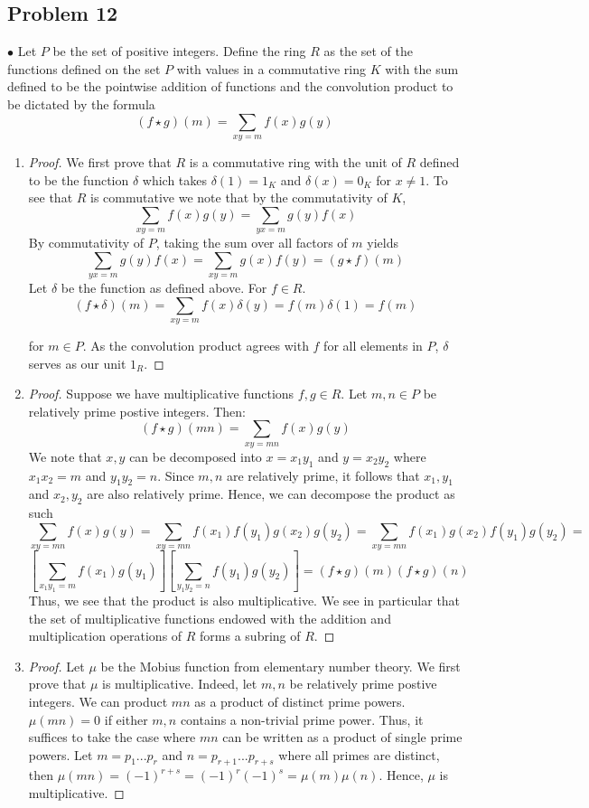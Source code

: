 \documentclass[Lang.tex]{subfiles}
\begin{document}
\subsection{Problem 12}			
 $\bullet$  Let $P$ be the set of positive integers. Define the ring $R$ as the set of the functions defined on the set $P$ with values in a commutative ring $K$ with the sum defined to be the pointwise addition of functions and the convolution product to be dictated by the formula
 $$ (f \star g)(m)  = \sum_{xy = m} f(x)g(y) $$ 
\begin{enumerate}
	\item 
	\begin{proof}
		We first prove that $R$ is a commutative ring with the unit of $R$ defined to be the function $\delta$ which takes $\delta(1) = 1_K$ and $\delta(x) = 0_K$ for $x \neq 1$. To see that $R$ is commutative we note that by the commutativity of $K$, $$ \sum_{xy = m}f(x)g(y) = \sum_{yx = m} g(y)f(x) $$ By commutativity of $P$, taking the sum over all factors of $m$ yields  $$\sum_{yx = m} g(y)f(x) = \sum_{xy = m} g(x)f(y) = (g\star f)(m)$$ Let $\delta$ be the function as defined above. For $f \in R$.
		$$ (f \star \delta)(m) = \sum_{xy = m} f(x)\delta(y) =  f(m)\delta(1)  = f(m) $$ 
		
		for $m \in P$. As the convolution product agrees with $f$ for all elements in $P$, $\delta$ serves as our unit $1_R$.
	\end{proof}
	\item 
		\begin{proof}
			Suppose we have multiplicative functions $f,g \in R$. Let $m,n \in P$ be relatively prime postive integers. Then:
			$$ (f \star g)(mn) = \sum_{xy = mn} f(x)g(y) $$ We note that $x,y$ can be decomposed into $x = x_1y_1$ and $y = x_2y_2$ where $x_1x_2  = m$ and $y_1y_2 = n$. Since $m,n$ are relatively prime, it follows that $x_1,y_1$ and $x_2,y_2$ are also relatively prime. Hence, we can decompose the product as such
			$$ \sum_{xy = mn} f(x)g(y) = \sum_{xy = mn} f(x_1)f(y_1)g(x_2)g(y_2) = \sum_{xy = mn} f(x_1)g(x_2)f(y_1)g(y_2) =$$
			$$ [\sum_{x_1y_1 = m} f(x_1)g(y_1)][\sum_{y_1y_2 = n} f(y_1)g(y_2)] = (f \star g)(m)(f \star g)(n)$$ Thus, we see that the product is also multiplicative. We see in particular that the set of multiplicative functions endowed with the addition and multiplication operations of $R$ forms a subring of $R$.
		\end{proof}
	\item
		\begin{proof}
			Let $\mu$ be the Mobius function from elementary number theory. We first prove that $\mu$ is multiplicative. Indeed, let $m,n$ be relatively prime postive integers. We can product $mn$ as a product of distinct prime powers. $\mu(mn) = 0$ if either $m,n$ contains a non-trivial prime power. Thus, it suffices to take the case where $mn$ can be written as a product of single prime powers. Let $m = p_1...p_r$ and $n = p_{r+1}...p_{r+s}$ where all primes are distinct, then $\mu(mn) = (-1)^{r+s} = (-1)^r(-1)^s = \mu(m)\mu(n)$. Hence, $\mu$ is multiplicative. 
			

\end{proof}
\end{enumerate}
\end{document}
